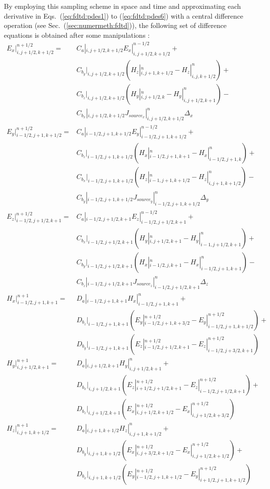 \documentclass[a4paper, 12pt]{article}
\newcommand{\sect}[1]{Sec.\ (\ref{#1})}
\newcommand{\eqr}[2]{Eqs.\ (\ref{#1}) to (\ref{#2})}
\begin{document}
	By employing this sampling scheme in space and time and approximating
	each derivative in \eqr{eq:fdtd:pdes1}{eq:fdtd:pdes6} with a central difference
	operation (see \sect{sec:numermeth:fdtd}), the following set of
	difference equations is obtained after some manipulations \cite{taflove00book}:
	\begin{align}
		\label{eq:fdtd:diff1}
		E_x|^{n+1/2}_{i,j+1/2,k+1/2}=&C_a|_{i,j+1/2,k+1/2}E_x|^{n-1/2}_{i,j+1/2,k+1/2}+\nonumber\\
		& C_{b_y}|_{i,j+1/2,k+1/2}\left(H_z|^n_{i,j+1,k+1/2} -
		H_z|^n_{i,j,k+1/2}\right)+\nonumber\\&C_{b_z}|_{i,j+1/2,k+1/2}\left(H_y|^n_{i,j+1/2,k}-H_y|^n_{i,j+1/2,k+1}\right)-\nonumber\\&C_{b_x}|_{i,j+1/2,k+1/2}{J_{source_x}}|^n_{i,j+1/2,k+1/2}\Delta_x
		\\
		\label{eq:fdtd:diff2}
		E_y|^{n+1/2}_{i-1/2,j+1,k+1/2}=&C_a|_{i-1/2,j+1,k+1/2}E_y|^{n-1/2}_{i-1/2,j+1,k+1/2}+\nonumber\\
		&C_{b_z}|_{i-1/2,j+1,k+1/2}\left(H_x|^n_{i-1/2,j+1,k+1} -
		H_x|^n_{i-1/2,j+1,k}\right)+\nonumber\\&C_{b_x}|_{i-1/2,j+1,k+1/2}\left(H_z|^n_{i-1,j+1,k+1/2}-H_z|^n_{i,j+1,k+1/2}\right)-\nonumber\\&C_{b_y}|_{i-1/2,j+1,k+1/2}{J_{source_y}}|^n_{i-1/2,j+1,k+1/2}\Delta_y\\
		\label{eq:fdtd:diff3}
		E_z|^{n+1/2}_{i-1/2,j+1/2,k+1}=&C_a|_{i-1/2,j+1/2,k+1}E_z|^{n-1/2}_{i-1/2,j+1/2,k+1}+\nonumber\\
		&C_{b_x}|_{i-1/2,j+1/2,k+1}\left(H_y|^n_{i,j+1/2,k+1} -
		H_y|^n_{i-1,j+1/2,k+1}\right)+\nonumber\\&C_{b_y}|_{i-1/2,j+1/2,k+1}\left(H_x|^n_{i-1/2,j,k+1}-H_x|^n_{i-1/2,j+1,k+1}\right)-\nonumber\\&C_{b_z}|_{i-1/2,j+1/2,k+1}{J_{source_z}}|^n_{i-1/2,j+1/2,k+1}\Delta_z\\
		\label{eq:fdtd:diff4}
		H_x|^{n+1}_{i-1/2,j+1,k+1}=&D_a|_{i-1/2,j+1,k+1}H_x|^{n}_{i-1/2,j+1,k+1}+\nonumber\\
		& D_{b_z}|_{i-1/2,j+1,k+1}\left(E_y|^{n+1/2}_{i-1/2,j+1,k+3/2} -
		E_y|^{n+1/2}_{i-1/2,j+1,k+1/2}\right)+\nonumber\\&D_{b_y}|_{i-1/2,j+1,k+1}\left(E_z|^{n+1/2}_{i-1/2,j+1/2,k+1}-E_z|^{n+1/2}_{i-1/2,j+3/2,k+1}\right)\\
		\label{eq:fdtd:diff5}
		H_y|^{n+1}_{i,j+1/2,k+1}=&D_a|_{i,j+1/2,k+1}H_y|^{n}_{i,j+1/2,k+1}+\nonumber\\
		&D_{b_x}|_{i,j+1/2,k+1}\left(E_z|^{n+1/2}_{i+1/2,j+1/2,k+1} -
		E_z|^{n+1/2}_{i-1/2,j+1/2,k+1}\right)+\nonumber\\&D_{b_z}|_{i,j+1/2,k+1}\left(E_x|^{n+1/2}_{i,j+1/2,k+1/2}-E_x|^{n+1/2}_{i,j+1/2,k+3/2}\right)\\
		\label{eq:fdtd:diff6}
		H_z|^{n+1}_{i,j+1,k+1/2}=&D_a|_{i,j+1,k+1/2}H_z|^{n}_{i,j+1,k+1/2}+\nonumber\\
		&D_{b_y}|_{i,j+1,k+1/2}\left(E_x|^{n+1/2}_{i,j+3/2,k+1/2} -
		E_x|^{n+1/2}_{i,j+1/2,k+1/2}\right)+\nonumber\\&D_{b_x}|_{i,j+1,k+1/2}\left(E_y|^{n+1/2}_{i-1/2,j+1,k+1/2}-E_y|^{n+1/2}_{i+1/2,j+1,k+1/2}\right)
	\end{align}
\end{document}
